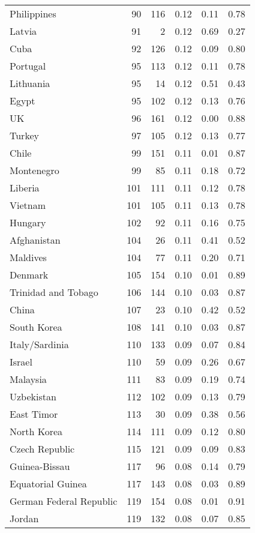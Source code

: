 \begin{longtable}[t]{lrrrrr}
Philippines & 90 & 116 & 0.12 & 0.11 & 0.78\\
\addlinespace
Latvia & 91 & 2 & 0.12 & 0.69 & 0.27\\
Cuba & 92 & 126 & 0.12 & 0.09 & 0.80\\
Portugal & 95 & 113 & 0.12 & 0.11 & 0.78\\
Lithuania & 95 & 14 & 0.12 & 0.51 & 0.43\\
Egypt & 95 & 102 & 0.12 & 0.13 & 0.76\\
\addlinespace
UK & 96 & 161 & 0.12 & 0.00 & 0.88\\
Turkey & 97 & 105 & 0.12 & 0.13 & 0.77\\
Chile & 99 & 151 & 0.11 & 0.01 & 0.87\\
Montenegro & 99 & 85 & 0.11 & 0.18 & 0.72\\
Liberia & 101 & 111 & 0.11 & 0.12 & 0.78\\
\addlinespace
Vietnam & 101 & 105 & 0.11 & 0.13 & 0.78\\
Hungary & 102 & 92 & 0.11 & 0.16 & 0.75\\
Afghanistan & 104 & 26 & 0.11 & 0.41 & 0.52\\
Maldives & 104 & 77 & 0.11 & 0.20 & 0.71\\
Denmark & 105 & 154 & 0.10 & 0.01 & 0.89\\
\addlinespace
Trinidad and Tobago & 106 & 144 & 0.10 & 0.03 & 0.87\\
China & 107 & 23 & 0.10 & 0.42 & 0.52\\
South Korea & 108 & 141 & 0.10 & 0.03 & 0.87\\
Italy/Sardinia & 110 & 133 & 0.09 & 0.07 & 0.84\\
Israel & 110 & 59 & 0.09 & 0.26 & 0.67\\
\addlinespace
Malaysia & 111 & 83 & 0.09 & 0.19 & 0.74\\
Uzbekistan & 112 & 102 & 0.09 & 0.13 & 0.79\\
East Timor & 113 & 30 & 0.09 & 0.38 & 0.56\\
North Korea & 114 & 111 & 0.09 & 0.12 & 0.80\\
Czech Republic & 115 & 121 & 0.09 & 0.09 & 0.83\\
\addlinespace
Guinea-Bissau & 117 & 96 & 0.08 & 0.14 & 0.79\\
Equatorial Guinea & 117 & 143 & 0.08 & 0.03 & 0.89\\
German Federal Republic & 119 & 154 & 0.08 & 0.01 & 0.91\\
Jordan & 119 & 132 & 0.08 & 0.07 & 0.85\\

\end{longtable}
